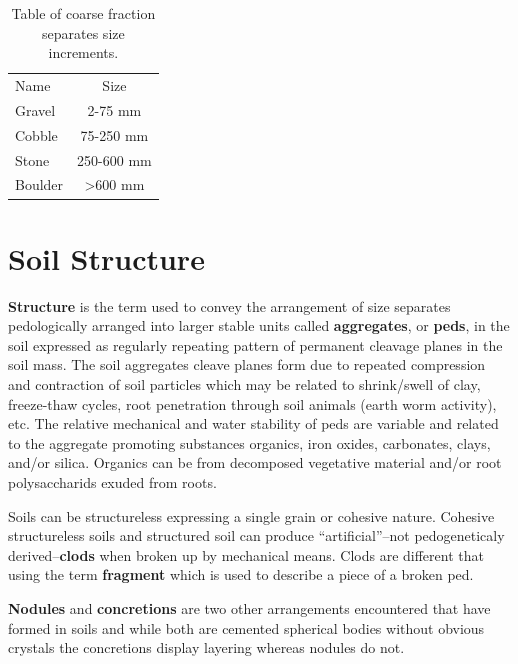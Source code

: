 \documentclass{article}
\begin{document}
\begin{table}[!htbp]
\centering
\caption{Table of coarse fraction separates size increments.}
\label{tab:coarsefractionsizenames}
\begin{tabular}{|l c|}
\hline
Name        &  Size                \\ \hhline{|==|}
Gravel      & 2-75 mm              \\
Cobble      & 75-250 mm            \\
Stone       & 250-600 mm           \\
Boulder     & \textgreater{}600 mm \\
\hline
\end{tabular}
\end{table}

    
\section{Soil Structure}
\label{structure}
    
\textbf{Structure} is the term used to convey the arrangement of size separates pedologically arranged into larger stable units called \textbf{aggregates}, or \textbf{peds}, in the soil expressed as regularly repeating pattern of permanent cleavage planes in the soil mass. The soil aggregates cleave planes form due to repeated compression and contraction of soil particles which may be related to shrink/swell of clay, freeze-thaw cycles, root penetration through soil animals (earth worm activity), etc. The relative mechanical and water stability of peds are variable and related to the aggregate promoting substances organics, iron oxides, carbonates, clays, and/or silica. Organics can be from decomposed vegetative material and/or root polysaccharids exuded from roots.
    
Soils can be structureless expressing a single grain or cohesive nature. Cohesive structureless soils and structured soil can produce “artificial”–not pedogeneticaly derived–\textbf{clods} when broken up by mechanical means. Clods are different that using the term \textbf{fragment} which is used to describe a piece of a broken ped.
    
\textbf{Nodules} and \textbf{concretions} are two other arrangements encountered that have formed in soils and while both are cemented spherical bodies without obvious crystals the concretions display layering whereas nodules do not.
    
\end{document}
